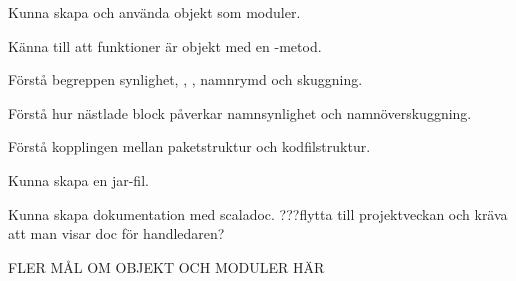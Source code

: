 
\item Kunna skapa och använda objekt som moduler.
\item Känna till att funktioner är objekt med en -metod.
\item Förstå begreppen synlighet, , , namnrymd och skuggning.
\item Förstå hur nästlade block påverkar namnsynlighet och namnöverskuggning.
\item Förstå kopplingen mellan paketstruktur och kodfilstruktur.
\item Kunna skapa en jar-fil.
\item Kunna skapa dokumentation med scaladoc. \TODO ???flytta till projektveckan och kräva att man visar doc för handledaren?
\item \TODO FLER MÅL OM OBJEKT OCH MODULER HÄR

